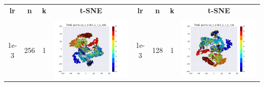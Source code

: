\documentclass[12pt]{report}
\begin{document}
\begin{table}[H]
  \centering
  \begin{tabular}{ | c | c | c | c || c | c | c| c |}
    \hline
    \textbf{lr} & \textbf{n} & \textbf{k} & \textbf{t-SNE} & \textbf{lr} & \textbf{n} & \textbf{k} & \textbf{t-SNE} \\
     &  &  &  & & & & \\ \hline
    1e-3 & 256 & 1 &
    \begin{minipage}{.3\textwidth}
      \includegraphics[scale=0.25]{cd_lr_0_001_k_1_n_256.png}
    \end{minipage}
	&
    1e-3 & 128 & 1 &
    \begin{minipage}{.3\textwidth}
      \includegraphics[scale=0.25]{cd_lr_0_001_k_1_n_128.png}

\end{minipage}
\end{tabular}
\end{table}
\end{document}
